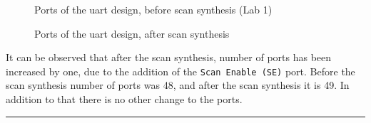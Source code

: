 \documentclass[a4paper,11pt]{article}%
\begin{document}
\begin{figure}[h]
	\centering
	\caption{Ports of the \ac{uart} design, before scan synthesis (Lab 1)}
	\label{fig:ports_lab1}
\end{figure}

\begin{figure}[h]
	\centering
	\caption{Ports of the \ac{uart} design, after scan synthesis}
	\label{fig:ports_after_scan_synthesis}
\end{figure}

It can be observed that after the scan synthesis, number of ports has been increased by one, due to the addition of the {\tt Scan Enable (SE)} port. Before the scan synthesis number of ports was 48, and after the scan synthesis it is 49. In addition to that there is no other change to the ports.

\pagebreak
\vfill
\hrule
{\small


}
\end{document}
